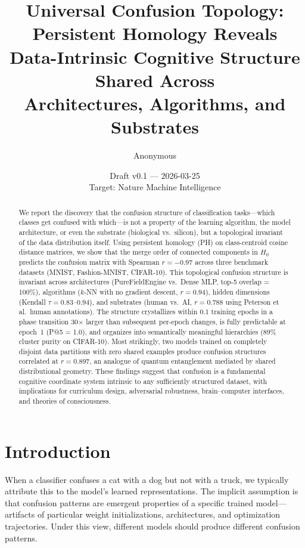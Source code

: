 \documentclass[11pt,a4paper]{article}
\title{Universal Confusion Topology: Persistent Homology Reveals\\
Data-Intrinsic Cognitive Structure Shared Across\\
Architectures, Algorithms, and Substrates}
\author{Anonymous}
\date{Draft v0.1 --- 2026-03-25\\
Target: Nature Machine Intelligence}
\begin{document}
\maketitle

\begin{abstract}
We report the discovery that the confusion structure of classification tasks---which classes get confused with which---is not a property of the learning algorithm, the model architecture, or even the substrate (biological vs.\ silicon), but a topological invariant of the data distribution itself. Using persistent homology (PH) on class-centroid cosine distance matrices, we show that the merge order of connected components in $H_0$ predicts the confusion matrix with Spearman $r = -0.97$ across three benchmark datasets (MNIST, Fashion-MNIST, CIFAR-10). This topological confusion structure is invariant across architectures (PureFieldEngine vs.\ Dense MLP, top-5 overlap = 100\%), algorithms ($k$-NN with no gradient descent, $r = 0.94$), hidden dimensions (Kendall $\tau = 0.83$--$0.94$), and substrates (human vs.\ AI, $r = 0.788$ using Peterson et al.\ human annotations). The structure crystallizes within 0.1 training epochs in a phase transition 30$\times$ larger than subsequent per-epoch changes, is fully predictable at epoch~1 (P@5 = 1.0), and organizes into semantically meaningful hierarchies (89\% cluster purity on CIFAR-10). Most strikingly, two models trained on completely disjoint data partitions with zero shared examples produce confusion structures correlated at $r = 0.897$, an analogue of quantum entanglement mediated by shared distributional geometry. These findings suggest that confusion is a fundamental cognitive coordinate system intrinsic to any sufficiently structured dataset, with implications for curriculum design, adversarial robustness, brain--computer interfaces, and theories of consciousness.
\end{abstract}

\section{Introduction}

When a classifier confuses a cat with a dog but not with a truck, we typically attribute this to the model's learned representations. The implicit assumption is that confusion patterns are emergent properties of a specific trained model---artifacts of particular weight initializations, architectures, and optimization trajectories. Under this view, different models should produce different confusion patterns.
\end{document}
